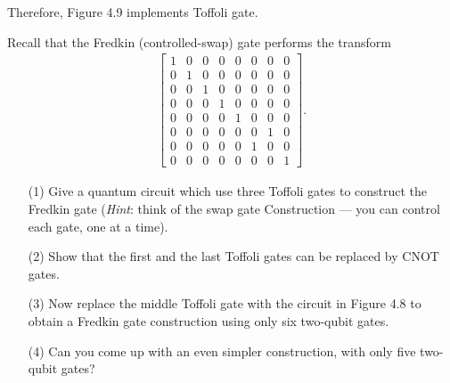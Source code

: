 \documentclass[en]{sol-man}
\begin{document}
\begin{pf}
    Therefore, Figure 4.9 implements Toffoli gate.
\end{pf}

\begin{exe}
    Recall that the Fredkin (controlled-swap) gate performs the transform
    \begin{align}
        \begin{bmatrix}
            1&0&0&0&0&0&0&0\\
            0&1&0&0&0&0&0&0\\
            0&0&1&0&0&0&0&0\\
            0&0&0&1&0&0&0&0\\
            0&0&0&0&1&0&0&0\\
            0&0&0&0&0&0&1&0\\
            0&0&0&0&0&1&0&0\\
            0&0&0&0&0&0&0&1
        \end{bmatrix}.
    \end{align}
    \begin{itemize}
        \item[(1)] Give a quantum circuit which use three Toffoli gates to construct the Fredkin gate (\emph{Hint}: think of the swap gate Construction --- you can control each gate, one at a time).
        \item[(2)] Show that the first and the last Toffoli gates can be replaced by CNOT gates.
        \item[(3)] Now replace the middle Toffoli gate with the circuit in Figure 4.8 to obtain a Fredkin gate construction using only six two-qubit gates.
        \item[(4)] Can you come up with an even simpler construction, with only five two-qubit gates?
    \end{itemize}
\end{exe}
\end{document}
